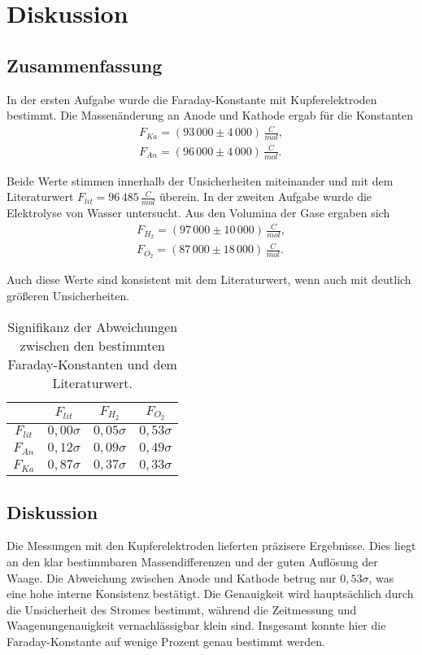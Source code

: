 \chapter{Diskussion}
\label{sc:dis}

\section{Zusammenfassung}
In der ersten Aufgabe wurde die Faraday-Konstante mit Kupferelektroden bestimmt. 
Die Massenänderung an Anode und Kathode ergab für die Konstanten
\begin{align}
    F_{Ka} = (93\,000 \pm 4\,000)\,\frac{C}{mol}, \\ 
    F_{An} = (96\,000 \pm 4\,000)\,\frac{C}{mol}.    
\end{align}

Beide Werte stimmen innerhalb der Unsicherheiten miteinander und mit dem Literaturwert $F_{lit} = 96\,485\,\frac{C}{mol}$ überein.  
In der zweiten Aufgabe wurde die Elektrolyse von Wasser untersucht. Aus den Volumina der Gase ergaben sich 
\begin{align}
    F_{H_2} = (97\,000 \pm 10\,000)\,\frac{C}{mol}, \\
    F_{O_2} = (87\,000 \pm 18\,000)\,\frac{C}{mol}.
\end{align}

Auch diese Werte sind konsistent mit dem Literaturwert, wenn auch mit deutlich größeren Unsicherheiten.

\begin{table}[h!]
\centering
\begin{tabular}{c|c|c|c}
\toprule
 & $F_{lit}$ & $F_{H_2}$ & $F_{O_2}$ \\
\midrule
$F_{lit}$ & $0,00\sigma$ & $0,05\sigma$ & $0,53\sigma$ \\
$F_{An}$  & $0,12\sigma$ & $0,09\sigma$ & $0,49\sigma$ \\
$F_{Ka}$  & $0,87\sigma$ & $0,37\sigma$ & $0,33\sigma$ \\
\bottomrule
\end{tabular}
\caption{Signifikanz der Abweichungen zwischen den bestimmten Faraday-Konstanten und dem Literaturwert.}
\label{tab:sigmas}
\end{table}


\section{Diskussion}
Die Messungen mit den Kupferelektroden lieferten präzisere Ergebnisse. 
Dies liegt an den klar bestimmbaren Massendifferenzen und der guten Auflösung der Waage. 
Die Abweichung zwischen Anode und Kathode betrug nur $0,53\sigma$, was eine hohe interne Konsistenz bestätigt.  
Die Genauigkeit wird hauptsächlich durch die Unsicherheit des Stromes bestimmt, während die Zeitmessung und Waagenungenauigkeit vernachlässigbar klein sind. 
Insgesamt konnte hier die Faraday-Konstante auf wenige Prozent genau bestimmt werden.

